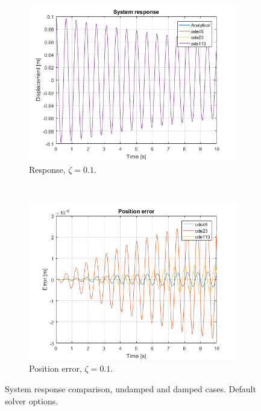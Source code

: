 \documentclass{article}
\begin{document}
\begin{figure}[h]
		\begin{subfigure}[t]{0.45\textwidth}
			\includegraphics[width=\textwidth]{response_comparison_damped.png}
			\caption{Response, $\zeta = 0.1$.}
		\end{subfigure}
		~
		\begin{subfigure}[t]{0.45\textwidth}
			\includegraphics[width=\textwidth]{error_comparison_damped.png}
			\caption{Position error, $\zeta = 0.1$.}
		\end{subfigure}
		\caption{System response comparison, undamped and damped cases. Default solver options.}
		\label{fig:response}
	\end{figure}
	
\end{document}
